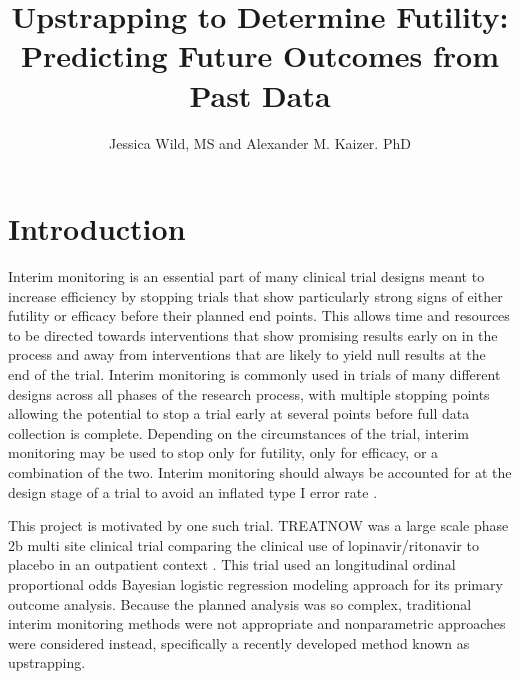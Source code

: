\documentclass[Afour,sageh,times,square,numbers]{sagej}
\begin{document}
\title{Upstrapping to Determine Futility: Predicting Future Outcomes from Past Data}

\author{Jessica Wild, MS and Alexander M. Kaizer. PhD}






\maketitle

\section{Introduction}

Interim monitoring is an essential part of many clinical trial designs meant to increase efficiency by stopping trials that show particularly strong signs of either futility or efficacy before their planned end points.  This allows time and resources to be directed towards interventions that show promising results early on in the process and away from interventions that are likely to yield null results at the end of the trial.  Interim monitoring is commonly used in trials of many different designs across all phases of the research process, with multiple stopping points allowing the potential to stop a trial early at several points before full data collection is complete.  Depending on the circumstances of the trial, interim monitoring may be used to stop only for futility, only for efficacy, or a combination of the two.  Interim monitoring should always be accounted for at the design stage of a trial to avoid an inflated type I error rate \cite{R1,R2,R3}.

This project is motivated by one such trial.  TREATNOW was a large scale phase 2b multi site clinical trial comparing the clinical use of lopinavir/ritonavir to placebo in an outpatient context \cite{R4}.  This trial used an longitudinal ordinal proportional odds Bayesian logistic regression modeling approach for its primary outcome analysis.  Because the planned analysis was so complex, traditional interim monitoring methods were not appropriate and nonparametric approaches were considered instead, specifically a recently developed method known as upstrapping.
\end{document}
